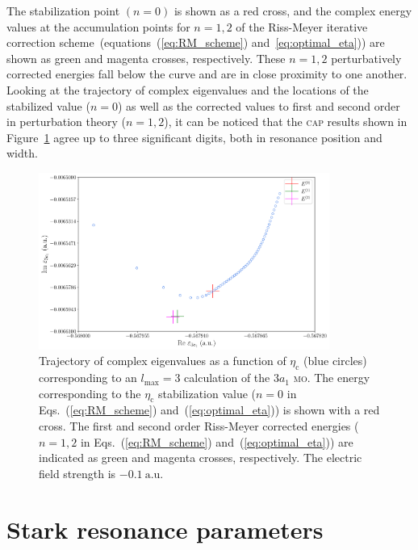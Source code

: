 The stabilization point $(n = 0)$ is shown as a red cross, and the
complex energy values at the accumulation points for $n = 1, 2$ of the
Riss-Meyer iterative correction scheme~(equations~(\ref{eq:RM_scheme})
and~\ref{eq:optimal_eta})) are shown as green and magenta crosses,
respectively. These $n = 1, 2$ perturbatively corrected energies fall
below the curve and are in close proximity to one another. Looking at
the trajectory of complex eigenvalues and the locations of the
stabilized value ($n = 0$) as well as the corrected values to first
and second order in perturbation theory ($n = 1, 2$), it can be
noticed that the \textsc{cap} results shown in
Figure~\ref{fig:3a1_RMtrajectory} agree up to three significant
digits, both in resonance position and width.



\begin{figure}
  \centering
  \includegraphics[width=0.85\textwidth]{figures/ch_H2O/partial_wave/3a1trajectory.pdf}
  \caption{Trajectory of complex eigenvalues as a function of
    $\eta_{\mathrm{c}}$ (blue circles) corresponding to an
    $l_{\mathrm{max}}=3$ calculation of the $3a_{1}$ \textsc{mo}. The
    energy corresponding to the $\eta_{\mathrm{c}}$ stabilization
    value ($n=0$ in Eqs.~(\ref{eq:RM_scheme})
    and~(\ref{eq:optimal_eta})) is shown with a red cross. The first
    and second order Riss-Meyer corrected energies ($n=1,2$ in
    Eqs.~(\ref{eq:RM_scheme}) and~(\ref{eq:optimal_eta})) are
    indicated as green and magenta crosses, respectively. The electric
    field strength is $-0.1\ \mathrm{a.u.}$}
  \label{fig:3a1_RMtrajectory}
\end{figure}



\section{Stark resonance parameters}
\label{ch:stark_params}

